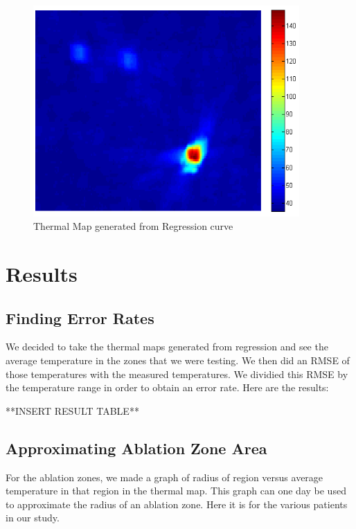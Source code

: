 \documentclass[]{spie}  %
\begin{document}
\begin{figure} 
\centering 
\includegraphics[width=4in]{slidingDiffThermalMap.png} 
\caption{Thermal Map generated from Regression curve} 
\end{figure}


\section{Results}

\subsection{Finding Error Rates}

We decided to take the thermal maps generated from regression and see the average temperature in the zones that we were testing. We then did an RMSE of those temperatures with the measured temperatures. We dividied this RMSE by the temperature range in order to obtain an error rate. Here are the results:

**INSERT RESULT TABLE**

\subsection{Approximating Ablation Zone Area}

For the ablation zones, we made a graph of radius of region versus average temperature in that region in the thermal map. This graph can one day be used to approximate the radius of an ablation zone. Here it is for the various patients in our study. 
\end{document}

